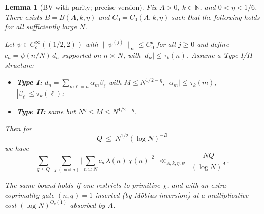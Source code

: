 \documentclass[11pt]{article}
\newtheorem{lemma}{Lemma}[section]
\theoremstyle{definition}
\theoremstyle{remark}
\begin{document}
\begin{lemma}[BV with parity; precise version]\label{lem:BV-parity-precise}
	Fix $A>0$, $k\in\mathbb N$, and $0<\eta<1/6$. There exists $B=B(A,k,\eta)$ and $C_0=C_0(A,k,\eta)$ such that the following holds for all sufficiently large $N$.

	Let $\psi\in C_c^\infty((1/2,2))$ with $\|\psi^{(j)}\|_\infty\le C_0^{j}$ for all $j\ge 0$ and define $c_n = \psi(n/N)\,d_n$ supported on $n\asymp N$, with $|d_n|\le \tau_k(n)$. Assume a Type I/II structure:

	\begin{itemize}
		\item \textbf{Type I:} $d_n=\sum_{m\ell=n}\alpha_m\beta_\ell$ with $M\le N^{1/2-\eta}$, $|\alpha_m|\le \tau_k(m)$, $|\beta_\ell|\le \tau_k(\ell)$;
		\item \textbf{Type II:} same but $N^{\eta}\le M\le N^{1/2-\eta}$.
	\end{itemize}

	Then for
	\[
		Q\ \le\ N^{1/2}(\log N)^{-B}
	\]
	we have
	\[
		\sum_{q\le Q}\ \sum_{\chi\ (\mathrm{mod}\ q)}\Bigg|\sum_{n\asymp N} c_n\,\lambda(n)\,\chi(n)\Bigg|^2\ \ \ll_{A,k,\eta,\psi}\ \ \frac{NQ}{(\log N)^A}.
	\]

	The same bound holds if one restricts to primitive $\chi$, and with an extra coprimality gate $(n,q)=1$ inserted (by Möbius inversion) at a multiplicative cost $(\log N)^{O_{k}(1)}$ absorbed by $A$.
\end{lemma}
\end{document}
